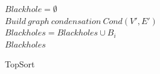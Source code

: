 \documentclass[12pt,a4paper,oneside]{article}
\theoremstyle{definition}
\theoremstyle{lemma}
\theoremstyle{remark}
\begin{document}
\begin{figure}[H]
	\begin{center}
		\begin{algorithm}[H]
			\SetAlgoLined
                        
                        $Blackhole = \emptyset$\\
                        $Build\ graph\ condensation\ Cond(V',E')$\\
                         {
                             {
                                 {
                                     {
                                        $Blackholes = Blackholes \cup B_i$ \\
                                    }
                                }
                            }
                        }
                        \Return $Blackholes$
			\label{alg:topsort}
			\caption{TopSort}
		\end{algorithm}
	\end{center}
\end{figure}
\end{document}
